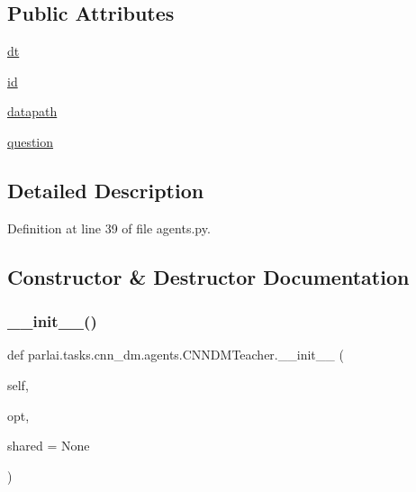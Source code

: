 \subsection*{Public Attributes}
\begin{DoxyCompactItemize}
\item 
\hyperlink{classparlai_1_1tasks_1_1cnn__dm_1_1agents_1_1CNNDMTeacher_a53c9a947f820813c147c427ee932110b}{dt}
\item 
\hyperlink{classparlai_1_1tasks_1_1cnn__dm_1_1agents_1_1CNNDMTeacher_a0057b9cfef0a8a164db0b795980c41e1}{id}
\item 
\hyperlink{classparlai_1_1tasks_1_1cnn__dm_1_1agents_1_1CNNDMTeacher_ac5bd6f991445d012def0d4891084ed06}{datapath}
\item 
\hyperlink{classparlai_1_1tasks_1_1cnn__dm_1_1agents_1_1CNNDMTeacher_adabc9a81947bb5e85f132fc7676958e6}{question}
\end{DoxyCompactItemize}


\subsection{Detailed Description}


Definition at line 39 of file agents.\+py.



\subsection{Constructor \& Destructor Documentation}
\mbox{\label{classparlai_1_1tasks_1_1cnn__dm_1_1agents_1_1CNNDMTeacher_a2a874e26d57c9f9c399a757f670f9133}} 
\subsubsection{\texorpdfstring{\+\_\+\+\_\+init\+\_\+\+\_\+()}{\_\_init\_\_()}}
{\footnotesize\ttfamily def parlai.\+tasks.\+cnn\+\_\+dm.\+agents.\+C\+N\+N\+D\+M\+Teacher.\+\_\+\+\_\+init\+\_\+\+\_\+ (\begin{DoxyParamCaption}\item[{}]{self,  }\item[{}]{opt,  }\item[{}]{shared = {\ttfamily None} }\end{DoxyParamCaption})}




